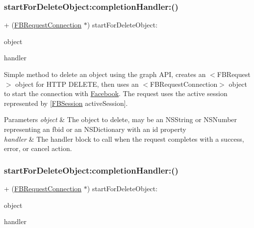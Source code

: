 \subsubsection{\texorpdfstring{start\+For\+Delete\+Object\+:completion\+Handler\+:()}{startForDeleteObject:completionHandler:()}\hspace{0.1cm}{\footnotesize\ttfamily [4/5]}}
{\footnotesize\ttfamily + (\hyperlink{interfaceFBRequestConnection}{F\+B\+Request\+Connection} $\ast$) start\+For\+Delete\+Object\+: \begin{DoxyParamCaption}\item[{(id)}]{object }\item[{completionHandler:(F\+B\+Request\+Handler)}]{handler }\end{DoxyParamCaption}}

Simple method to delete an object using the graph A\+PI, creates an $<$\+F\+B\+Request$>$ object for H\+T\+TP D\+E\+L\+E\+TE, then uses an $<$\+F\+B\+Request\+Connection$>$ object to start the connection with \hyperlink{interfaceFacebook}{Facebook}. The request uses the active session represented by {\ttfamily \mbox{[}\hyperlink{interfaceFBSession}{F\+B\+Session} active\+Session\mbox{]}}.


\begin{DoxyParams}{Parameters}
{\em object} & The object to delete, may be an N\+S\+String or N\+S\+Number representing an fbid or an N\+S\+Dictionary with an id property \\
\hline
{\em handler} & The handler block to call when the request completes with a success, error, or cancel action. \\
\hline
\end{DoxyParams}
\mbox{\label{interfaceFBRequestConnection_a3fc3ae420d8e47fd0b7a6b915622c527}} 
\subsubsection{\texorpdfstring{start\+For\+Delete\+Object\+:completion\+Handler\+:()}{startForDeleteObject:completionHandler:()}\hspace{0.1cm}{\footnotesize\ttfamily [5/5]}}
{\footnotesize\ttfamily + (\hyperlink{interfaceFBRequestConnection}{F\+B\+Request\+Connection} $\ast$) start\+For\+Delete\+Object\+: \begin{DoxyParamCaption}\item[{(id)}]{object }\item[{completionHandler:(F\+B\+Request\+Handler)}]{handler }\end{DoxyParamCaption}}

